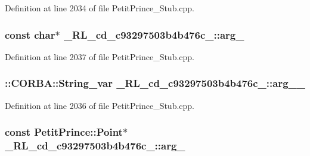 Definition at line 2034 of file Petit\+Prince\+\_\+\+Stub.\+cpp.

\subsubsection[{\texorpdfstring{arg\+\_\+0}{arg_0}}]{\setlength{\rightskip}{0pt plus 5cm}const char$\ast$ \+\_\+R\+L\+\_\+cd\+\_\+c93297503b4b476c\+\_\+::arg\+\_}\hypertarget{class__0_r_l__cd__c93297503b4b476c__11000000_a028225d9a02bc49290dc044801396b57}{}\label{class__0_r_l__cd__c93297503b4b476c__11000000_a028225d9a02bc49290dc044801396b57}


Definition at line 2037 of file Petit\+Prince\+\_\+\+Stub.\+cpp.

\subsubsection[{\texorpdfstring{arg\+\_\+0\+\_\+}{arg_0_}}]{\setlength{\rightskip}{0pt plus 5cm}\+::C\+O\+R\+B\+A\+::\+String\+\_\+var \+\_\+R\+L\+\_\+cd\+\_\+c93297503b4b476c\+\_\+::arg\+\_\+\_\+}\hypertarget{class__0_r_l__cd__c93297503b4b476c__11000000_abdc0a1fecfa33dd766c72760623a2bb0}{}\label{class__0_r_l__cd__c93297503b4b476c__11000000_abdc0a1fecfa33dd766c72760623a2bb0}


Definition at line 2036 of file Petit\+Prince\+\_\+\+Stub.\+cpp.

\subsubsection[{\texorpdfstring{arg\+\_\+1}{arg_1}}]{\setlength{\rightskip}{0pt plus 5cm}const Petit\+Prince\+::\+Point$\ast$ \+\_\+R\+L\+\_\+cd\+\_\+c93297503b4b476c\+\_\+::arg\+\_}\hypertarget{class__0_r_l__cd__c93297503b4b476c__11000000_ab3cb660dcca4e79904955484dce2b56e}{}\label{class__0_r_l__cd__c93297503b4b476c__11000000_ab3cb660dcca4e79904955484dce2b56e}


